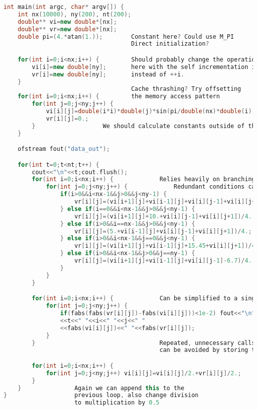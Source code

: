 \documentclass[10pt]{report}
\begin{document}
\begin{lstlisting}[language=C++, caption=Original code listing]
int main(int argc, char* argv[]) {
    int nx(10000), ny(200), nt(200);        
    double** vi=new double*[nx];
    double** vr=new double*[nx];
    double pi=(4.*atan(1.));        Constant here? Could use M_PI 
                                    Direct initialization?

    for(int i=0;i<nx;i++) {         Should probably change the operation order 
        vi[i]=new double[ny];       here with the self incrementation ie. ++i
        vr[i]=new double[ny];       instead of ++i. 
    }
                                    Cache thrashing? Try offsetting
    for(int i=0;i<nx;i++) {         the memory access pattern 
        for(int j=0;j<ny;j++) {       
            vi[i][j]=double(i*i)*double(j)*sin(pi/double(nx)*double(i));  
            vr[i][j]=0.;     
        }                   We should calculate constants outside of the loop
    }

    ofstream fout("data_out");

    for(int t=0;t<nt;t++) {
        cout<<"\n"<<t;cout.flush();
        for(int i=0;i<nx;i++) {             Relies heavily on branching 'if' conditionals
            for(int j=0;j<ny;j++) {             Redundant conditions can be simplified
                if(i>0&&i<nx-1&&j>0&&j<ny-1) {
                    vr[i][j]=(vi[i+1][j]+vi[i-1][j]+vi[i][j-1]+vi[i][j+1])/4.;
                } else if(i==0&&i<nx-1&&j>0&&j<ny-1) {
                    vr[i][j]=(vi[i+1][j]+10.+vi[i][j-1]+vi[i][j+1])/4.;
                } else if(i>0&&i==nx-1&&j>0&&j<ny-1) {                 
                    vr[i][j]=(5.+vi[i-1][j]+vi[i][j-1]+vi[i][j+1])/4.;
                } else if(i>0&&i<nx-1&&j==0&&j<ny-1) {
                    vr[i][j]=(vi[i+1][j]+vi[i-1][j]+15.45+vi[i][j+1])/4.;
                } else if(i>0&&i<nx-1&&j>0&&j==ny-1) {
                    vr[i][j]=(vi[i+1][j]+vi[i-1][j]+vi[i][j-1]-6.7)/4.;
                }
            }
        }

        for(int i=0;i<nx;i++) {             Can be simplified to a single loop
            for(int j=0;j<ny;j++) {         
                if(fabs(fabs(vr[i][j])-fabs(vi[i][j]))<1e-2) fout<<"\n"
                <<t<<" "<<i<<" "<<j<<" "
                <<fabs(vi[i][j])<<" "<<fabs(vr[i][j]);
            }
        }                                   Repeated, unnecessary calls to fabs() 
                                            can be avoided by storing the value

        for(int i=0;i<nx;i++) {
            for(int j=0;j<ny;j++) vi[i][j]=vi[i][j]/2.+vr[i][j]/2.;      
        }                                                                 
    }               Again we can append this to the                  
}                   previous loop, also change division
                    to multiplication by 0.5
\end{lstlisting}
\end{document}
